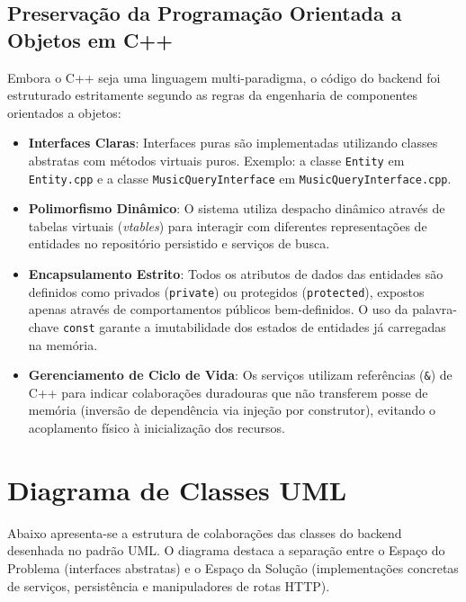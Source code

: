 \documentclass[12pt,a4paper]{article}
\begin{document}
\subsection{Preservação da Programação Orientada a Objetos em C++}
Embora o C++ seja uma linguagem multi-paradigma, o código do backend foi estruturado estritamente segundo as regras da engenharia de componentes orientados a objetos:
\begin{itemize}
    \item \textbf{Interfaces Claras}: Interfaces puras são implementadas utilizando classes abstratas com métodos virtuais puros. Exemplo: a classe \texttt{Entity} em \texttt{Entity.cpp} e a classe \texttt{MusicQueryInterface} em \texttt{MusicQueryInterface.cpp}.
    \item \textbf{Polimorfismo Dinâmico}: O sistema utiliza despacho dinâmico através de tabelas virtuais (\textit{vtables}) para interagir com diferentes representações de entidades no repositório persistido e serviços de busca.
    \item \textbf{Encapsulamento Estrito}: Todos os atributos de dados das entidades são definidos como privados (\texttt{private}) ou protegidos (\texttt{protected}), expostos apenas através de comportamentos públicos bem-definidos. O uso da palavra-chave \texttt{const} garante a imutabilidade dos estados de entidades já carregadas na memória.
    \item \textbf{Gerenciamento de Ciclo de Vida}: Os serviços utilizam referências (\texttt{\&}) de C++ para indicar colaborações duradouras que não transferem posse de memória (inversão de dependência via injeção por construtor), evitando o acoplamento físico à inicialização dos recursos.
\end{itemize}

\newpage

\section{Diagrama de Classes UML}
Abaixo apresenta-se a estrutura de colaborações das classes do backend desenhada no padrão UML. O diagrama destaca a separação entre o Espaço do Problema (interfaces abstratas) e o Espaço da Solução (implementações concretas de serviços, persistência e manipuladores de rotas HTTP).
\end{document}
